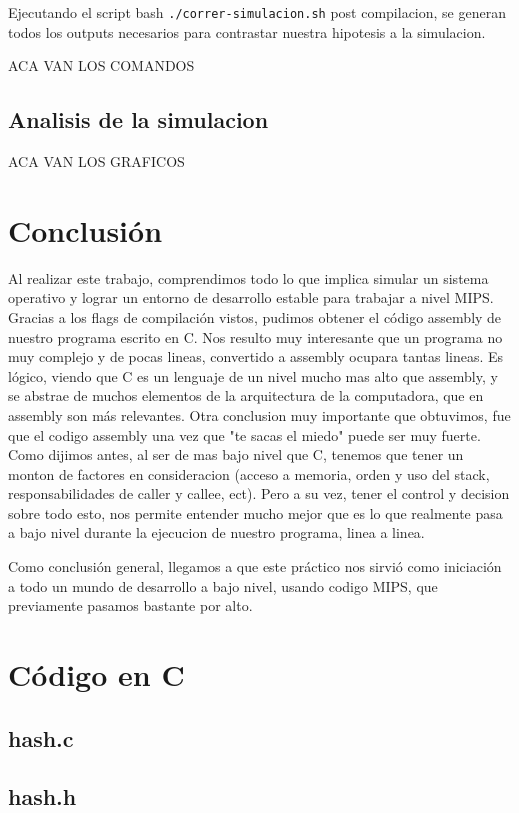 \documentclass[11pt,a4paper]{article}
\begin{document}
Ejecutando el script bash \texttt{./correr-simulacion.sh} post compilacion, se generan todos los outputs necesarios para contrastar nuestra hipotesis a la simulacion.

ACA VAN LOS COMANDOS

\subsection{Analisis de la simulacion} 

ACA VAN LOS GRAFICOS

\section{Conclusión}
Al realizar este trabajo, comprendimos todo lo que implica simular un sistema operativo y lograr un entorno de desarrollo estable para trabajar a nivel MIPS.
Gracias a  los flags de compilación vistos, pudimos obtener el código assembly de nuestro programa escrito en C. Nos resulto muy interesante que un programa no muy complejo y de pocas lineas, convertido a assembly ocupara tantas lineas. Es lógico, viendo que C es un lenguaje de un nivel mucho mas alto que assembly, y se abstrae de muchos elementos de la arquitectura de la computadora, que en assembly son más relevantes.
Otra conclusion muy importante que obtuvimos, fue que el codigo assembly una vez que "te sacas el miedo" puede ser muy fuerte. Como dijimos antes, al ser de mas bajo nivel que C, tenemos que tener un monton de factores en consideracion (acceso a memoria, orden y uso del stack, responsabilidades de caller y callee, ect). Pero a su vez, tener el control y decision sobre todo esto, nos permite entender mucho mejor que es lo que realmente pasa a bajo nivel durante la ejecucion de nuestro programa, linea a linea.

Como conclusión general, llegamos a que este práctico nos sirvió como iniciación a todo un mundo de desarrollo a bajo nivel, usando codigo MIPS, que previamente pasamos bastante por alto.


\section{Código en C}
\subsection{hash.c}

\subsection{hash.h}

\end{document}
